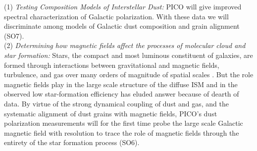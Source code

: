 \documentclass[PICOReport.tex]{subfiles}
\begin{document}
%
(1) {\em Testing Composition Models of Interstellar Dust:} 
PICO will give improved spectral characterization of Galactic polarization. With these data we will discriminate among models of Galactic dust composition and grain alignment (SO7).  \\
%
(2) {\em Determining how magnetic fields affect the processes of molecular cloud and star formation:}
Stars, the compact and most luminous constituent of galaxies, are formed through interactions between gravitational and magnetic fields, turbulence, and gas over many orders of magnitude of spatial scales . But the role magnetic fields play in the large scale structure of the diffuse \ac{ISM} and in the observed low star-formation efficiency has eluded answer because of dearth of data. 
By virtue of the strong dynamical coupling of dust and gas, and the systematic alignment of dust grains with magnetic fields, PICO's dust polarization measurements will for the first time probe the large scale Galactic magnetic field with resolution to trace the role of magnetic fields through the entirety of the star formation process (SO6). 

\end{document}
